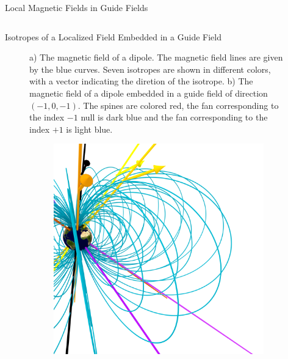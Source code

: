 \documentclass[final]{beamer}
\newlength{\onecolwid}
\newlength{\twocolwid}
\begin{document}
\begin{frame}[t]
\begin{columns}[t]
\begin{column}{\twocolwid}
\begin{block}{\huge{Local Magnetic Fields in Guide Fields}}
\begin{columns}[t,totalwidth=\twocolwid]
\begin{column}{\onecolwid}
\begin{block}{Isotropes of a Localized Field Embedded in a Guide Field}
\begin{figure}
\begin{subfigure}[b]{.45\textwidth}
      \caption{}
    \end{subfigure}
    \caption{
      a) The magnetic field of a dipole.
      The magnetic field lines are given by the blue curves.
      Seven isotropes are shown in different colors, with a vector indicating the diretion of the
      isotrope. b) The magnetic field of a dipole embedded in a guide field of direction $(-1,0,-1)$. 
      The spines are colored red, the fan corresponding to the
      index $-1$ null is dark blue and the fan corresponding to the
      index $+1$ is light blue.
    }
  \end{figure}
  \begin{figure}
    \centering
    \begin{subfigure}[b]{.45\textwidth}
      \includegraphics[width=\textwidth]{fig/mainfig.png}
      \caption{}
    \end{subfigure}
    \begin{subfigure}[b]{.45\textwidth}

\end{subfigure}
\end{figure}
\end{block}
\end{column}
\end{columns}
\end{block}
\end{column}
\end{columns}
\end{frame}
\end{document}
